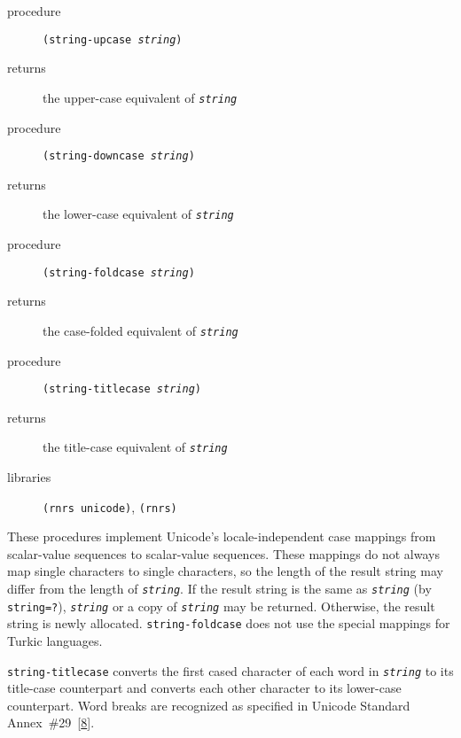 \begin{description}

\label{objects_s226}\item[procedure] \texttt{(string-upcase \textit{string})}



\item[returns] the upper-case equivalent of \texttt{\textit{string}}


\item[procedure] \texttt{(string-downcase \textit{string})}



\item[returns] the lower-case equivalent of \texttt{\textit{string}}


\item[procedure] \texttt{(string-foldcase \textit{string})}



\item[returns] the case-folded equivalent of \texttt{\textit{string}}


\item[procedure] \texttt{(string-titlecase \textit{string})}



\item[returns] the title-case equivalent of \texttt{\textit{string}}


\item[libraries] \texttt{(rnrs unicode)}, \texttt{(rnrs)}
\end{description}


These procedures implement Unicode's locale-independent case mappings from
scalar-value sequences to scalar-value sequences.
These mappings do not always map single characters to single characters, so
the length of the result string may differ from the length of \texttt{\textit{string}}.
If the result string is the same as \texttt{\textit{string}} (by \texttt{string=?}),
\texttt{\textit{string}} or a copy of \texttt{\textit{string}} may be returned.
Otherwise, the result string is newly allocated.
\texttt{string-foldcase} does not use the special mappings for Turkic
languages.

\texttt{string-titlecase} converts the first cased character of each word
in \texttt{\textit{string}} to its title-case counterpart and converts each other
character to its lower-case counterpart.
Word breaks are recognized as specified in Unicode Standard
Annex \#{}29 [\hyperref[bibliography_g226]{8}].

